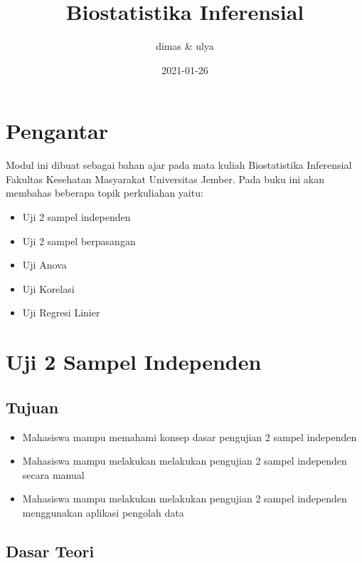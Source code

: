 \documentclass[
]{book}
\title{Biostatistika Inferensial}
\author{dimas \& ulya}
\date{2021-01-26}
\providecommand{\tightlist}{%
  \setlength{\itemsep}{0pt}\setlength{\parskip}{0pt}}
\begin{document}
\maketitle

{
\setcounter{tocdepth}{1}
\tableofcontents
}
\hypertarget{pengantar}{%
\chapter{Pengantar}\label{pengantar}}

Modul ini dibuat sebagai bahan ajar pada mata kuliah Biostatistika Inferensial Fakultas Kesehatan Masyarakat Universitas Jember. Pada buku ini akan membahas beberapa topik perkuliahan yaitu:

\begin{itemize}
\tightlist
\item
  Uji 2 sampel independen
\item
  Uji 2 sampel berpasangan
\item
  Uji Anova
\item
  Uji Korelasi
\item
  Uji Regresi Linier
\end{itemize}

\hypertarget{uji2sampelind}{%
\chapter{Uji 2 Sampel Independen}\label{uji2sampelind}}

\hypertarget{tujuan}{%
\section{Tujuan}\label{tujuan}}

\begin{itemize}
\tightlist
\item
  Mahasiswa mampu memahami konsep dasar pengujian 2 sampel independen
\item
  Mahasiswa mampu melakukan melakukan pengujian 2 sampel independen secara manual
\item
  Mahasiswa mampu melakukan melakukan pengujian 2 sampel independen menggunakan aplikasi pengolah data
\end{itemize}

\hypertarget{dasar-teori}{%
\section{Dasar Teori}\label{dasar-teori}}
\end{document}
